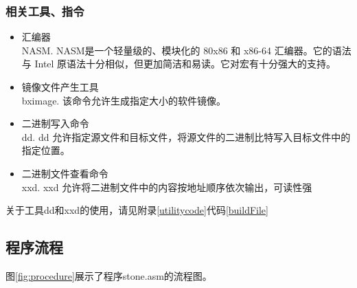 \documentclass[a4paper]{article}
\begin{document}
\subsubsection{相关工具、指令}
\begin{itemize}
    \item 汇编器\\ 
    NASM. NASM是一个轻量级的、模块化的 80x86 和 x86-64 汇编器。它的语法与
    Intel 原语法十分相似，但更加简洁和易读。它对宏有十分强大的支持。
    \item 镜像文件产生工具\\ 
    bximage. 该命令允许生成指定大小的软件镜像。
    \item 二进制写入命令\\ 
    dd. dd 允许指定源文件和目标文件，将源文件的二进制比特写入目标文件中的指定位置。
    \item 二进制文件查看命令\\ 
    xxd. xxd 允许将二进制文件中的内容按地址顺序依次输出，可读性强
\end{itemize}
关于工具dd和xxd的使用，请见附录\ref{utilitycode}代码\ref{buildFile}
\subsection{程序流程}\label{programProcedure}
图\ref{fig:procedure}展示了程序stone.asm的流程图。\\
\end{document}
